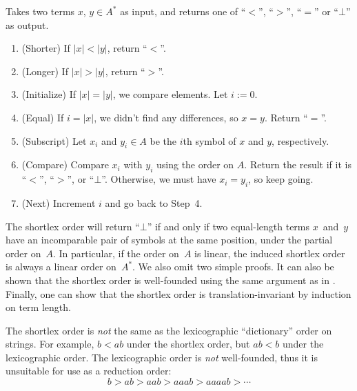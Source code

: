 \documentclass[../generics]{subfiles}
\begin{document}
\begin{algorithm}\label{shortlex}
Takes two terms $x$, $y\in A^*$ as input, and returns one of ``$<$'', ``$>$'', ``$=$'' or \index{$\bot$}``$\bot$'' as output.
\begin{enumerate}
\item (Shorter) If $|x|<|y|$, return ``$<$''.
\item (Longer) If $|x|>|y|$, return ``$>$''.
\item (Initialize) If $|x|=|y|$, we compare elements. Let $i:=0$.
\item (Equal) If $i=|x|$, we didn't find any differences, so $x=y$. Return ``$=$''.
\item (Subscript) Let $x_i$ and $y_i\in A$ be the $i$th symbol of $x$ and $y$, respectively.
\item (Compare) Compare $x_i$ with $y_i$ using the order on $A$. Return the result if it is ``$<$'', ``$>$'', or ``$\bot$''. Otherwise, we must have $x_i=y_i$, so keep going.
\item (Next) Increment $i$ and go back to Step~4.
\end{enumerate}
\end{algorithm}
The shortlex order will return ``$\bot$'' if and only if two equal-length terms $x$~and~$y$ have an incomparable pair of symbols at the same position, under the partial order on~$A$. In particular, if the order on~$A$ is linear, the induced shortlex order is always a linear order on~$A^*$. We also omit two simple proofs. It can also be shown that the shortlex order is well-founded using the same argument as in . Finally, one can show that the shortlex order is translation-invariant by induction on term length.

\begin{example}
The shortlex order is \emph{not} the same as the lexicographic ``dictionary'' order on strings. For example, $b<ab$ under the shortlex order, but $ab<b$ under the lexicographic order. The lexicographic order is \emph{not} well-founded, thus it is unsuitable for use as a reduction order:
\[b>ab>aab>aaab>aaaab>\cdots\]
\end{example}
\end{document}
